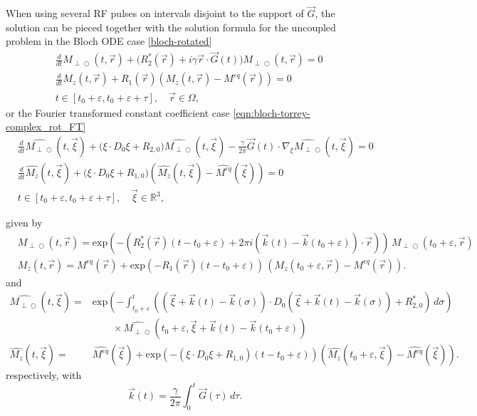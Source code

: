 \documentclass{ws-m3as}
\newcommand{\kspace}[1]{{#1}}
\def\Mpp{M_{\perp\!\!\!\!\!\bigcirc}}
\def\Mphp{\widehat{\Mpp}}
\newcommand\taup{\varepsilon}
\newcommand{\eexp}[1]{\text{exp}\left(#1\right)}
\newcommand{\revision}[1]{{ #1}}
\newcommand{\Margin}[1]{}
\begin{document}
When using several RF pulses on intervals disjoint to the support of ${\vec G}$, the solution can be pieced together with the solution formula for the uncoupled problem in the 
Bloch ODE case \eqref{bloch-rotated}
\begin{equation}\label{B_uncoupled}
\begin{aligned}
&\frac{d}{dt}\Mpp(t, \vec r) +\bigl(R_2^*(\vec r)+ i\gamma\vec r \cdot \vec G(t)\bigr)\Mpp(t, \vec r) =0\\    
&\frac{d}{dt}M_z(t, \vec r) +R_1(\vec r) (M_z(t, \vec r)-M^{eq}(\vec r))=0\\
&t\in[t_0+\taup,t_0+\taup+\tau], \quad \vec r\in \Omega,
\end{aligned}
\end{equation}
\kspace{
or the Fourier transformed constant coefficient case \eqref{eqn:bloch-torrey-complex_rot_FT}
\begin{equation}\label{BT0_uncoupled}
\begin{aligned}
&\frac{d}{dt}\Mphp(t, \vec\xi) 
+\bigl(\xi\cdot D_0\xi +R_{2,0}\bigr)\Mphp(t, \vec\xi)
-\frac{\gamma}{2\pi}\vec G(t)\cdot\nabla_\xi\Mphp(t, \vec\xi)=0\\    
&\frac{d}{dt}\widehat{M_z}(t, \vec\xi) 
+\bigl(\xi\cdot D_0\xi +R_{1,0}\bigr) (\widehat{M_z}(t, \vec\xi)-\widehat{M^{eq}}(\vec\xi))=0\\
&t\in[t_0+\taup,t_0+\taup+\tau],\quad \vec\xi\in \mathbb{R}^3,
\end{aligned}
\end{equation}
}
\Margin{R1 5.} 
given by
\begin{equation}\label{MperpMz_B}
\begin{aligned}
&\Mpp(t,\vec r)=
\revision{\eexp{-(R_2^*(\vec r)(t-t_0+\taup)+2\pi i ({\vec k}(t)-{\vec k}(t_0+\taup))\cdot{\vec r})}}\,\Mpp(t_0+\taup,\vec r)\\
&M_z(t,\vec r)= M^{eq}(\vec r)+ \revision{\eexp{-R_1(\vec r)(t-t_0+\taup)}}\,(M_z(t_0+\taup, \vec r)-M^{eq}(\vec r)).
\end{aligned}
\end{equation}
\kspace{
and 
\begin{equation}\label{hatMperpMz_BT0}
\begin{aligned}
\Mphp(t,\vec\xi)=&\revision{\eexp{-\int_{t_0+\taup}^t((\vec\xi+\vec k(t)-\vec k(\sigma))\cdot D_0(\vec\xi+\vec k(t)-\vec k(\sigma))+R_{2,0}^*)\, d\sigma}}\\
&\qquad\times\Mphp(t_0+\taup,\vec\xi+\vec k(t)-\vec k(t_0+\taup))\\
\widehat{M_z}(t,\vec\xi)=& \widehat{M^{eq}}(\vec\xi)+ \revision{\eexp{-(\xi\cdot D_0\xi +R_{1,0})(t-t_0+\taup)}} (\widehat{M_z}(t_0+\taup, \vec\xi)-\widehat{M^{eq}}(\vec\xi)).
\end{aligned}
\end{equation}
respectively, 
}
with
\begin{equation}\label{kt}
{\vec k}(t)=\frac{\gamma}{2\pi}\int_0^t \vec G(\tau)\, d\tau.
\end{equation}
\end{document}
